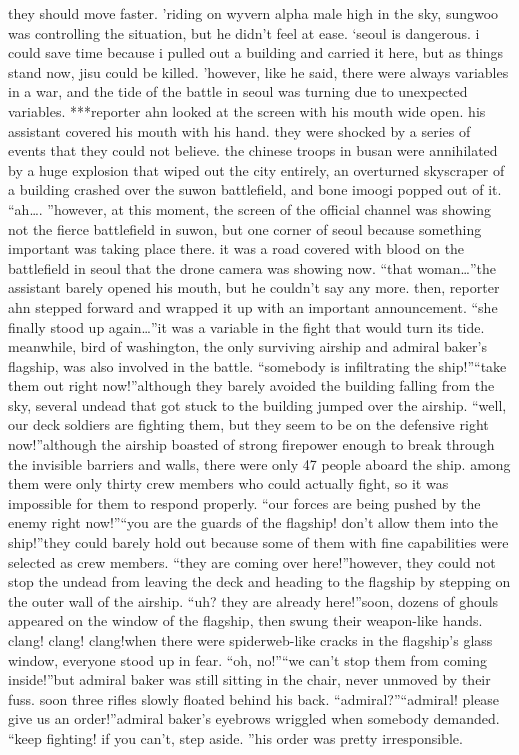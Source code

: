 they should move faster.
’riding on wyvern alpha male high in the sky, sungwoo was controlling the situation, but he didn’t feel at ease.
‘seoul is dangerous.
 i could save time because i pulled out a building and carried it here, but as things stand now, jisu could be killed.
’however, like he said, there were always variables in a war, and the tide of the battle in seoul was turning due to unexpected variables.
***reporter ahn looked at the screen with his mouth wide open.
 his assistant covered his mouth with his hand.
 they were shocked by a series of events that they could not believe.
the chinese troops in busan were annihilated by a huge explosion that wiped out the city entirely, an overturned skyscraper of a building crashed over the suwon battlefield, and bone imoogi popped out of it.
“ah….
”however, at this moment, the screen of the official channel was showing not the fierce battlefield in suwon, but one corner of seoul because something important was taking place there.
it was a road covered with blood on the battlefield in seoul that the drone camera was showing now.
“that woman…”the assistant barely opened his mouth, but he couldn’t say any more.
 then, reporter ahn stepped forward and wrapped it up with an important announcement.
“she finally stood up again…”it was a variable in the fight that would turn its tide.
meanwhile, bird of washington, the only surviving airship and admiral baker’s flagship, was also involved in the battle.
“somebody is infiltrating the ship!”“take them out right now!”although they barely avoided the building falling from the sky, several undead that got stuck to the building jumped over the airship.
“well, our deck soldiers are fighting them, but they seem to be on the defensive right now!”although the airship boasted of strong firepower enough to break through the invisible barriers and walls, there were only 47 people aboard the ship.
 among them were only thirty crew members who could actually fight, so it was impossible for them to respond properly.
“our forces are being pushed by the enemy right now!”“you are the guards of the flagship! don’t allow them into the ship!”they could barely hold out because some of them with fine capabilities were selected as crew members.
“they are coming over here!”however, they could not stop the undead from leaving the deck and heading to the flagship by stepping on the outer wall of the airship.
“uh? they are already here!”soon, dozens of ghouls appeared on the window of the flagship, then swung their weapon-like hands.
clang! clang! clang!when there were spiderweb-like cracks in the flagship’s glass window, everyone stood up in fear.
“oh, no!”“we can’t stop them from coming inside!”but admiral baker was still sitting in the chair, never unmoved by their fuss.
soon three rifles slowly floated behind his back.
“admiral?”“admiral! please give us an order!”admiral baker’s eyebrows wriggled when somebody demanded.
“keep fighting! if you can’t, step aside.
”his order was pretty irresponsible.


